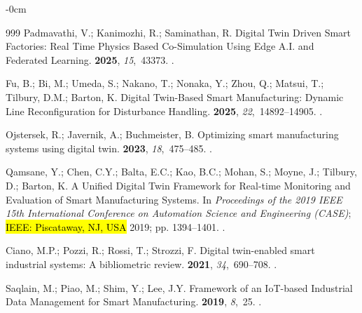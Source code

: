 \documentclass[systems,article,accept,pdftex,moreauthors]{Definitions/mdpi}
\begin{document}
\begin{adjustwidth}{-\extralength}{0cm}
\begin{thebibliography}{999}
Padmavathi, V.; Kanimozhi, R.; Saminathan, R.
\newblock Digital Twin Driven Smart Factories: Real Time Physics Based
  Co-Simulation Using Edge A.I. and Federated Learning.
 {\bf 2025}, {\em 15},~43373.
.

Fu, B.; Bi, M.; Umeda, S.; Nakano, T.; Nonaka, Y.; Zhou, Q.; Matsui, T.;
  Tilbury, D.M.; Barton, K.
\newblock Digital Twin-Based Smart Manufacturing: Dynamic Line Reconfiguration
  for Disturbance Handling.
 {\bf
  2025}, {\em 22},~14892--14905.
.

Ojstersek, R.; Javernik, A.; Buchmeister, B.
\newblock Optimizing smart manufacturing systems using digital twin.
 {\bf 2023}, {\em 18},~475--485.
.

Qamsane, Y.; Chen, C.Y.; Balta, E.C.; Kao, B.C.; Mohan, S.; Moyne, J.; Tilbury,
  D.; Barton, K.
\newblock A Unified Digital Twin Framework for Real-time Monitoring and
  Evaluation of Smart Manufacturing Systems.
\newblock In \textit{Proceedings of the 2019 IEEE 15th International Conference on
  Automation Science and Engineering (CASE)}; \hl{IEEE: Piscataway, NJ, USA} %
  2019; pp. 1394--1401.
.

Ciano, M.P.; Pozzi, R.; Rossi, T.; Strozzi, F.
\newblock Digital twin-enabled smart industrial systems: A bibliometric review.
 {\bf 2021}, {\em 34},~690--708.
.

Saqlain, M.; Piao, M.; Shim, Y.; Lee, J.Y.
\newblock Framework of an IoT-based Industrial Data Management for Smart
  Manufacturing.
 {\bf 2019}, {\em 8},~25.
.


\end{thebibliography}
\end{adjustwidth}
\end{document}
